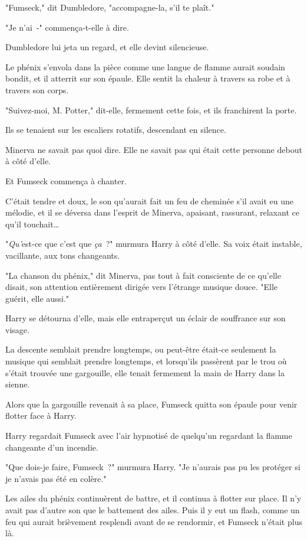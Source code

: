 "Fumseck," dit Dumbledore, "accompagne-la, s'il te plaît."

"Je n'ai~-" commença-t-elle à dire.

Dumbledore lui jeta un regard, et elle devint silencieuse.

Le phénix s'envola dans la pièce comme une langue de flamme aurait soudain bondit, et il atterrit sur son épaule. Elle sentit la chaleur à travers sa robe et à travers son corps.

"Suivez-moi, M. Potter," dit-elle, fermement cette fois, et ils franchirent la porte.

\later

Ils se tenaient sur les escaliers rotatifs, descendant en silence.

Minerva ne savait pas quoi dire. Elle ne savait pas qui était cette personne debout à côté d'elle.

Et Fumseck commença à chanter.

C'était tendre et doux, le son qu'aurait fait un feu de cheminée s'il avait eu une mélodie, et il se déversa dans l'esprit de Minerva, apaisant, rassurant, relaxant ce qu'il touchait…

"\emph{Qu'}est-ce que c'est que \emph{ça}~?" murmura Harry à côté d'elle. Sa voix était instable, vacillante, aux tons changeants.

"La chanson du phénix," dit Minerva, pas tout à fait consciente de ce qu'elle disait, son attention entièrement dirigée vers l'étrange musique douce. "Elle guérit, elle aussi."

Harry se détourna d'elle, mais elle entraperçut un éclair de souffrance sur son visage.

La descente semblait prendre longtemps, ou peut-être était-ce seulement la musique qui semblait prendre longtemps, et lorsqu'ils passèrent par le trou où s'était trouvée une gargouille, elle tenait fermement la main de Harry dans la sienne.

Alors que la gargouille revenait à sa place, Fumseck quitta son épaule pour venir flotter face à Harry.

Harry regardait Fumseck avec l'air hypnotisé de quelqu'un regardant la flamme changeante d'un incendie.

"Que dois-je faire, Fumseck~?" murmura Harry. "Je n'aurais pas pu les protéger si je n'avais pas été en colère."

Les ailes du phénix continuèrent de battre, et il continua à flotter sur place. Il n'y avait pas d'autre son que le battement des ailes. Puis il y eut un flash, comme un feu qui aurait brièvement resplendi avant de se rendormir, et Fumseck n'était plus là.

